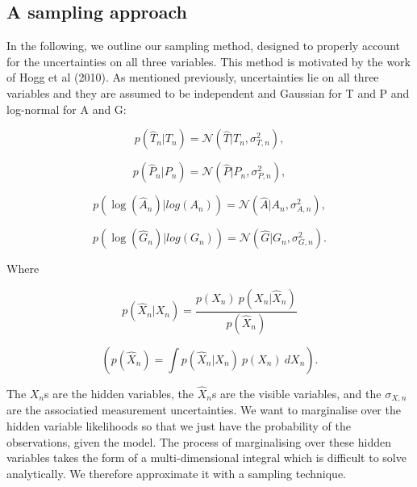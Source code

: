 \documentclass[12pt,preprint]{aastex}
\begin{document}
\subsection{A sampling approach}

In the following, we outline our sampling method, designed to properly account for the uncertainties on all three variables.
This method is motivated by the work of Hogg et al (2010).
As mentioned previously, uncertainties lie on all three variables and they are assumed to be independent and Gaussian for T and P and log-normal for A and G:

\begin{equation}
p(\hat{T}_n|T_n) = \mathcal{N}(\hat{T}|T_n, \sigma^2_{T,n}),
\label{eq:p1}
\end{equation}

\begin{equation}
p(\hat{P}_n|P_n) = \mathcal{N}(\hat{P}|P_n, \sigma^2_{P,n}),
\label{eq:p2}
\end{equation}

\begin{equation}
p(\log(\hat{A}_n)|log(A_n)) = \mathcal{N}(\hat{A}|A_n, \sigma^2_{A,n}),
\label{eq:p3}
\end{equation}

\begin{equation}
p(\log(\hat{G}_n)|log(G_n)) = \mathcal{N}(\hat{G}|G_n, \sigma^2_{G,n}).
\label{eq:p4}
\end{equation}

Where

\begin{equation}
	p(\hat{X}_n|X_n) = \frac{p(X_n)~p(X_n|\hat{X}_n)}{p(\hat{X}_n)}
\label{eq:post_def}
\end{equation}

\begin{equation}
	\left(p(\hat{X}_n) = \int{p(\hat{X}_n|X_n)~p(X_n)~dX_n}\right).
\end{equation}

The $X_n$s are the hidden variables, the $\hat{X}_n$s are the visible variables, and the $\sigma_{X,n}$ are the associatied measurement uncertainties.
We want to marginalise over the hidden variable likelihoods so that we just have the probability of the observations, given the model.
The process of marginalising over these hidden variables takes the form of a multi-dimensional integral which is difficult to solve analytically.
We therefore approximate it with a sampling technique.
\end{document}
